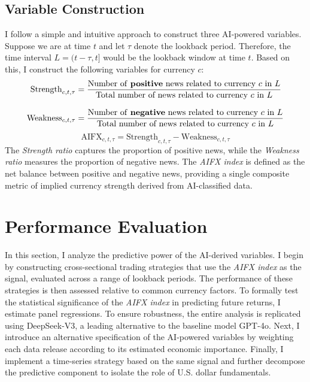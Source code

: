 \documentclass[12pt,oneside,letter]{article}
\begin{document}
		\subsection{Variable Construction}			\label{sec:Variable Construction} 
		I follow a simple and intuitive approach to construct three AI-powered variables. Suppose we are at time \(t\) and let \(\tau\) denote the lookback period. Therefore, the time interval \(L=(t-\tau,t]\) would be the lookback window at time \(t\). Based on this, I construct the following variables for currency \(c\):
		\begin{align}
			\text{Strength}_{c,t,\tau} &= \frac{\text{Number of \textbf{positive} news related to currency $c$ in $L$}}{\text{Total number of news related to currency $c$ in $L$}} 
			\label{eq:VariableConstruction:definition of pos ratio}\\[8pt]
			\text{Weakness}_{c,t,\tau} &= \frac{\text{Number of \textbf{negative} news related to currency $c$ in $L$}}{\text{Total number of news related to currency $c$ in $L$}} 
			\label{eq:VariableConstruction:definition of neg ratio}
		\end{align}
		\begin{equation}
			\text{AIFX}_{c,t,\tau} = \text{Strength}_{c,t,\tau} - \text{Weakness}_{c,t,\tau}
			\label{eq:VariableConstruction:definition of diff ratio}
		\end{equation}
		The \textit{Strength ratio} captures the proportion of positive news, while the \textit{Weakness ratio} measures the proportion of negative news. The \textit{AIFX index} is defined as the net balance between positive and negative news, providing a single composite metric of implied currency strength derived from AI-classified data.
		\section{Performance Evaluation}				 			\label{sec:Performance}
		In this section, I analyze the predictive power of the AI-derived variables. I begin by constructing cross-sectional trading strategies that use the \textit{AIFX index} as the signal, evaluated across a range of lookback periods. The performance of these strategies is then assessed relative to common currency factors. To formally test the statistical significance of the \textit{AIFX index} in predicting future returns, I estimate panel regressions. To ensure robustness, the entire analysis is replicated using DeepSeek-V3, a leading alternative to the baseline model GPT-4o. Next, I introduce an alternative specification of the AI-powered variables by weighting each data release according to its estimated economic importance. Finally, I implement a time-series strategy based on the same signal and further decompose the predictive component to isolate the role of U.S. dollar fundamentals.
		
\end{document}
